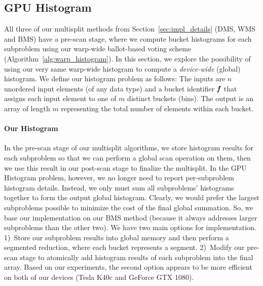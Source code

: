 \subsection{GPU Histogram}\label{subsec:multisplit_histogram}
All three of our multisplit methods from  Section~\ref{sec:impl_details}   (DMS, WMS and BMS) have a pre-scan stage, where we compute bucket histograms for each subproblem using our warp-wide ballot-based voting scheme (Algorithm~\ref{alg:warp_histogram}).
In this section, we explore the possibility of using our very same warp-wide histogram to compute a \emph{device-wide} (global) histogram.
We define our histogram problem as follows: The inputs are $n$ unordered input elements (of any data type) and a bucket identifier $\defn{f}$ that assigns each input element to one of $m$ distinct buckets (bins). The output is an array of length $m$ representing the total number of elements within each bucket.

\paragraph{Our Histogram} In the pre-scan stage of our multisplit algorithms, we store histogram results for each subproblem so that we can perform a global scan operation on them, then we use this result in our post-scan stage to finalize the multisplit.
In the GPU Histogram problem, however, we no longer need to report per-subproblem histogram details. Instead, we only must sum all subproblems' histograms together to form the output global histogram.
Clearly, we would prefer the largest subproblems possible to minimize the cost of the final global summation. So, we base our implementation on our BMS method (because it always addresses larger subproblems than the other two).
We have two main options for implementation. 1)~Store our subproblem results into global memory and then perform a segmented reduction, where each bucket represents a segment. 2)~Modify our pre-scan stage to atomically add histogram results of each subproblem into the final array.
Based on our experiments, the second option appears to be more efficient on both of our devices (Tesla K40c and GeForce GTX 1080).

